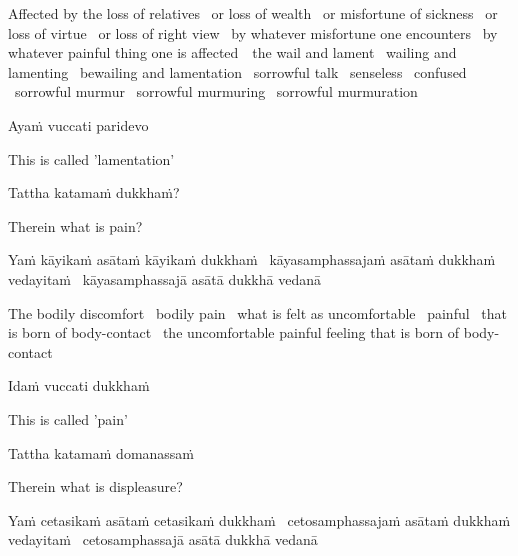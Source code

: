 \begin{english-hang-verses}
  Affected by the loss of relatives \breathmark\ or loss of wealth \breathmark\ or misfortune of sickness \breathmark\ or loss of virtue \breathmark\ or loss of right view \breathmark\ by whatever misfortune one encounters \breathmark\ by whatever painful thing one is \mbox{affected}~\breathmark\ the wail and lament \breathmark\ wailing and lamenting \breathmark\ bewailing and lamentation \breathmark\ sorrowful talk \breathmark\ senseless \breathmark\ confused \breathmark\ sorrowful murmur \breathmark\ sorrowful murmuring \breathmark\ sorrowful murmuration
\end{english-hang-verses}

Ayaṁ vuccati paridevo

\begin{english}
  This is called 'lamentation'
\end{english}

Tattha katamaṁ dukkhaṁ?

\begin{english}
  Therein what is pain?
\end{english}

\begin{pali-hang}
  Yaṁ kāyikaṁ asātaṁ kāyikaṁ dukkhaṁ \breathmark\ kāyasamphassajaṁ asātaṁ dukkhaṁ vedayitaṁ \breathmark\ kāyasamphassajā asātā dukkhā vedanā
\end{pali-hang}

\begin{english-hang-verses}
  The bodily discomfort \breathmark\ bodily pain \breathmark\ what is felt as uncomfortable \breathmark\ painful \breathmark\ that is born of body-contact \breathmark\ the uncomfortable painful feeling that is born of body-contact
\end{english-hang-verses}

Idaṁ vuccati dukkhaṁ

\begin{english}
  This is called 'pain'
\end{english}

Tattha katamaṁ domanassaṁ

\begin{english}
  Therein what is displeasure?
\end{english}

\begin{pali-hang}
  Yaṁ cetasikaṁ asātaṁ cetasikaṁ dukkhaṁ \breathmark\ cetosamphassajaṁ asātaṁ dukkhaṁ vedayitaṁ \breathmark\ cetosamphassajā asātā dukkhā vedanā
\end{pali-hang}


